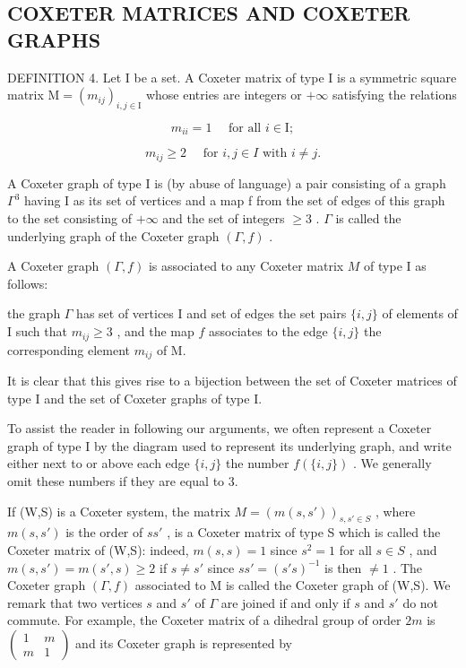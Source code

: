 \subsection{COXETER MATRICES AND COXETER GRAPHS}

DEFINITION 4. Let I be a set. A Coxeter matrix of type I is a symmetric square matrix \(\mathrm{M} = (m_{ij})_{i,j\in \mathrm{I}}\) whose entries are integers or \(+\infty\) satisfying the relations

\[
m _ {i i} = 1 \quad \text {   for   all   } i \in \mathrm{I};\tag{25}
\]

\[
m _ {i j} \geqslant 2 \quad \text {   for   } i, j \in I \text {   with   } i \neq j.\tag{26}
\]

A Coxeter graph of type I is (by abuse of language) a pair consisting of a graph \(\Gamma^{3}\) having I as its set of vertices and a map f from the set of edges of this graph to the set consisting of \(+\infty\) and the set of integers \(\geqslant 3\) . \(\Gamma\) is called the underlying graph of the Coxeter graph \((\Gamma, f)\) .

A Coxeter graph \((\Gamma, f)\) is associated to any Coxeter matrix \(M\) of type I as follows:

the graph \(\Gamma\) has set of vertices I and set of edges the set pairs \(\{i,j\}\) of elements of I such that \(m_{ij} \geqslant 3\) , and the map \(f\) associates to the edge \(\{i,j\}\) the corresponding element \(m_{ij}\) of M.

It is clear that this gives rise to a bijection between the set of Coxeter matrices of type I and the set of Coxeter graphs of type I.

To assist the reader in following our arguments, we often represent a Coxeter graph of type I by the diagram used to represent its underlying graph, and write either next to or above each edge \(\{i,j\}\) the number \(f(\{i,j\})\) . We generally omit these numbers if they are equal to 3.

If (W,S) is a Coxeter system, the matrix \(M = (m(s,s'))_{s,s' \in S}\) , where \(m(s,s')\) is the order of \(ss'\) , is a Coxeter matrix of type S which is called the Coxeter matrix of (W,S): indeed, \(m(s,s) = 1\) since \(s^2 = 1\) for all \(s \in S\) , and \(m(s,s') = m(s',s) \geqslant 2\) if \(s \neq s'\) since \(ss' = (s's)^{-1}\) is then \(\neq 1\) . The Coxeter graph \((\Gamma, f)\) associated to M is called the Coxeter graph of (W,S). We remark that two vertices \(s\) and \(s'\) of \(\Gamma\) are joined if and only if \(s\) and \(s'\) do not commute. For example, the Coxeter matrix of a dihedral group of order \(2m\) is \(\begin{pmatrix} 1 & m \\ m & 1 \end{pmatrix}\) and its Coxeter graph is represented by

